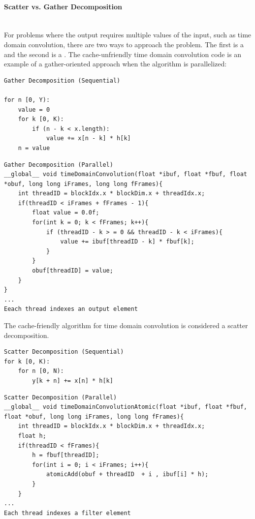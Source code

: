 \paragraph{Scatter vs. Gather Decomposition} \hspace{0pt} \\
\indent For problems where the output requires multiple values of the input, such as time domain convolution, there are two ways to approach the problem. The first is a  and the second is a  \citep{6216339}. The cache-unfriendly time domain convolution code is an example of a gather-oriented approach when the algorithm is parallelized:
\begin{verbatim}
Gather Decomposition (Sequential)

for n [0, Y):
    value = 0
    for k [0, K):
        if (n - k < x.length):
            value += x[n - k] * h[k]
    n = value

\end{verbatim}
\begin{verbatim}
Gather Decomposition (Parallel)
__global__ void timeDomainConvolution(float *ibuf, float *fbuf, float *obuf, long long iFrames, long long fFrames){
    int threadID = blockIdx.x * blockDim.x + threadIdx.x;
    if(threadID < iFrames + fFrames - 1){
        float value = 0.0f;
        for(int k = 0; k < fFrames; k++){
            if (threadID - k > = 0 && threadID - k < iFrames){
                value += ibuf[threadID - k] * fbuf[k];
            }
        }
        obuf[threadID] = value;
    }
}
...
Eeach thread indexes an output element
\end{verbatim}
The cache-friendly algorithm for time domain convolution is considered a scatter decomposition.

\begin{verbatim}
Scatter Decomposition (Sequential)
for k [0, K):
    for n [0, N):
        y[k + n] += x[n] * h[k]
\end{verbatim}
\begin{verbatim}
Scatter Decomposition (Parallel)
__global__ void timeDomainConvolutionAtomic(float *ibuf, float *fbuf, float *obuf, long long iFrames, long long fFrames){
    int threadID = blockIdx.x * blockDim.x + threadIdx.x;
	float h;
	if(threadID < fFrames){
		h = fbuf[threadID];
		for(int i = 0; i < iFrames; i++){
			atomicAdd(obuf + threadID  + i , ibuf[i] * h);
		}
	}
...
Each thread indexes a filter element
\end{verbatim}


